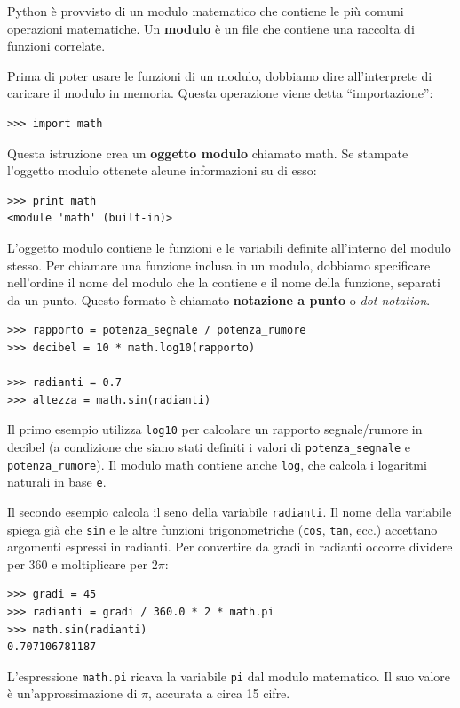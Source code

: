 \documentclass[10pt]{book}
\begin{document}
Python è provvisto di un modulo matematico che contiene le più comuni operazioni matematiche. Un {\bf modulo} è un file che contiene una raccolta di funzioni correlate.

Prima di poter usare le funzioni di un modulo, dobbiamo dire all'interprete di caricare il modulo in memoria. Questa operazione viene detta ``importazione'':

\begin{verbatim}
>>> import math
\end{verbatim}
%
Questa istruzione crea un {\bf oggetto modulo} chiamato math. Se stampate l'oggetto modulo ottenete alcune informazioni su di esso:

\begin{verbatim}
>>> print math
<module 'math' (built-in)>
\end{verbatim}
%
L'oggetto modulo contiene le funzioni e le variabili definite all'interno del modulo stesso. Per chiamare una funzione inclusa in un modulo, dobbiamo specificare nell'ordine il nome del modulo che la contiene e il nome della funzione, separati da un punto. Questo formato è chiamato {\bf notazione a punto} o {\em dot notation}.

\begin{verbatim}
>>> rapporto = potenza_segnale / potenza_rumore
>>> decibel = 10 * math.log10(rapporto)

>>> radianti = 0.7
>>> altezza = math.sin(radianti)
\end{verbatim}
%
Il primo esempio utilizza \verb"log10" per calcolare un rapporto segnale/rumore in decibel (a condizione che siano stati definiti i valori di \verb"potenza_segnale" e \verb"potenza_rumore").  Il modulo math contiene anche {\tt log}, che calcola i logaritmi naturali in base {\tt e}.


Il secondo esempio calcola il seno della variabile {\tt radianti}. Il nome della variabile spiega già che {\tt sin} e le altre funzioni trigonometriche ({\tt cos}, {\tt tan}, ecc.) accettano argomenti espressi in radianti. Per convertire da gradi in radianti occorre dividere per 360 e moltiplicare per $2 \pi$:

\begin{verbatim}
>>> gradi = 45
>>> radianti = gradi / 360.0 * 2 * math.pi
>>> math.sin(radianti)
0.707106781187
\end{verbatim}
%
L'espressione {\tt math.pi} ricava la variabile {\tt pi} dal modulo matematico. Il suo valore è un'approssimazione di $\pi$, accurata a circa 15 cifre. 
\end{document}
